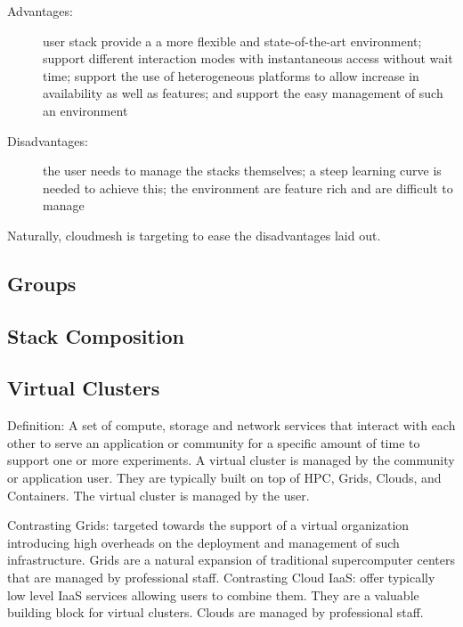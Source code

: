\begin{description}

\item[Advantages:] user stack provide a a more flexible and
  state-of-the-art environment; support different interaction modes
  with instantaneous access without wait time; support the use of
  heterogeneous platforms to allow increase in availability as well as
  features; and support the easy management of such an environment

\item[Disadvantages:] the user needs to manage the stacks themselves; a
  steep learning curve is needed to achieve this; the environment are
  feature rich and are difficult to manage

\end{description}

Naturally, cloudmesh is targeting to ease the disadvantages laid out.

\subsection{Groups} \label{S:groups}

\subsection{Stack Composition} \label{S:composition}

\subsection{Virtual Clusters}

Definition: A set of compute, storage and network services that
interact with each other to serve an application or community for a
specific amount of time to support one or more experiments. A virtual
cluster is managed by the community or application user. They are
typically built on top of HPC, Grids, Clouds, and Containers. The
virtual cluster is managed by the user.

Contrasting Grids: targeted towards the support of a virtual
organization introducing high overheads on the deployment and
management of such infrastructure. Grids are a natural expansion of
traditional supercomputer centers that are managed by professional
staff. Contrasting Cloud IaaS: offer typically low level IaaS services
allowing users to combine them. They are a valuable building block for
virtual clusters. Clouds are managed by professional staff.

